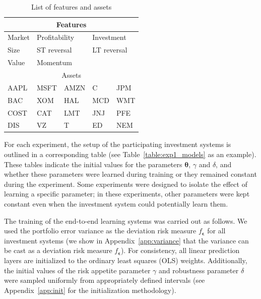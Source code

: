 \documentclass[10pt, twocolumn]{article}
\theoremstyle{plain}
\theoremstyle{definition}
\begin{document}
\begin{table}[!ht]
\caption{List of features and assets}
\centering
\begin{tabular}{lllll}
\toprule
	\multicolumn{5}{c}{Features} \\
\midrule
	Market & \multicolumn{2}{l}{\quad Profitability} & \multicolumn{2}{l}{Investment}\\[0.5ex]
	Size & \multicolumn{2}{l}{\quad ST reversal} & \multicolumn{2}{l}{LT reversal}\\[0.5ex]
	Value & \multicolumn{2}{l}{\quad Momentum}\\[0.5ex]
\toprule
	\multicolumn{5}{c}{Assets} \\
\midrule
	AAPL & MSFT & AMZN & C   & JPM \\[0.5ex]
	BAC  & XOM  & HAL  & MCD & WMT\\[0.5ex]
	COST & CAT  & LMT  & JNJ & PFE\\[0.5ex]
	DIS  & VZ   & T    & ED  & NEM\\[0.5ex]
\bottomrule
\end{tabular}
\label{table:assets}
\end{table}

For each experiment, the setup of the participating investment systems is 
outlined in a corresponding table (see Table~\ref{table:exp1_models} as an
example). These tables indicate the initial values for the parameters 
\(\bm{\theta}\), \(\gamma\) and \(\delta\), and whether these parameters
were learned during training or they remained constant during the 
experiment. Some experiments were designed to isolate the effect of 
learning a specific parameter; in these experiments, other parameters were
kept constant even when the investment system could potentially learn 
them.

The training of the end-to-end learning systems was carried out
as follows. We used the portfolio error variance as the deviation risk measure 
\(f_{\bm{\epsilon}}\) for all investment systems (we show in 
Appendix~\ref{app:variance} that the variance can be cast as a deviation 
risk measure \(f_{\bm{\epsilon}}\)). For consistency, all linear prediction 
layers are initialized to the ordinary least squares (OLS) weights. Additionally,
the initial values of the  risk appetite parameter \(\gamma\) and 
robustness parameter \(\delta\) were sampled uniformly from appropriately
defined intervals (see Appendix~\ref{app:init} for the initialization 
methodology).
\end{document}
